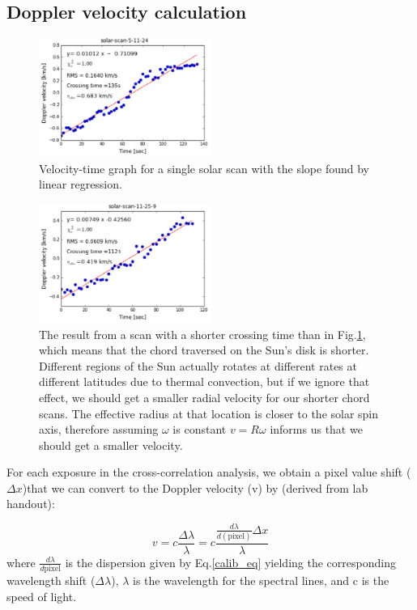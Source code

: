 \documentclass[authoryear, 12pt,5p, times]{elsarticle}
\begin{document}
\subsection{Doppler velocity calculation}
\label{results}
\begin{figure}[h!]
\includegraphics[width=0.5\textwidth]{figures/long_cord_dv}
\caption{Velocity-time graph for a single solar scan with the slope found by linear regression.}
\label{long_cord_dv}
\end{figure}
\begin{figure}[h!]
\includegraphics[width=0.5\textwidth]{figures/short_cord_dv}
\caption{The result from a scan with a shorter crossing time than in Fig.\ref{long_cord_dv}, which means that the chord traversed on the Sun's disk is shorter. Different regions of the Sun actually rotates at different rates at different latitudes due to thermal convection, but if we ignore that effect, we should get a smaller radial velocity for our shorter chord scans. The effective radius at that location is closer to the solar spin axis, therefore assuming $\omega$ is constant $v=R\omega$ informs us that we should get a smaller velocity.}
\label{short_cord_dv}
\end{figure}
\label{results}
For each exposure in the cross-correlation analysis, we obtain a pixel value shift ($\Delta x$)that we can convert to the Doppler velocity (v) by (derived from lab handout): 

\begin{equation}
v = c\frac{\Delta\lambda}{\lambda}=c \frac{\frac{d\lambda}{d(\text{pixel})}\Delta x}{\lambda}
\label{doppler_eq}
\end{equation}
where $\frac{d\lambda}{d\text{pixel}}$ is the dispersion given by Eq.\ref{calib_eq} yielding the corresponding wavelength shift ($\Delta \lambda$), $\lambda$ is the wavelength for the spectral lines, and c is the speed of light.
\end{document}

